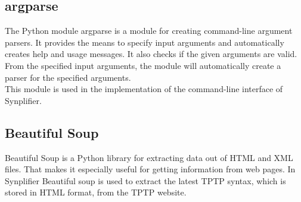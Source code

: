 \subsection{argparse}\label{sec:BackgroundArgparse}

The Python module argparse is a module for creating command-line argument parsers.
It provides the means to specify input arguments and automatically creates help and usage messages.
It also checks if the given arguments are valid.
From the specified input arguments, the module will automatically create a parser for the specified arguments. \cite{argparse}\\
This module is used in the implementation of the command-line interface of \ac{Synplifier}.

\subsection{Beautiful Soup}\label{sec:BackgroundBeautifulSoup}

Beautiful Soup is a Python library for extracting data out of HTML and XML files.
That makes it especially useful for getting information from web pages. \cite{BeautifulSoup,BeautifulSoupDoku}
In \ac{Synplifier} Beautiful soup is used to extract the latest \ac{TPTP} syntax, which is stored in HTML format, from the \ac{TPTP} website.